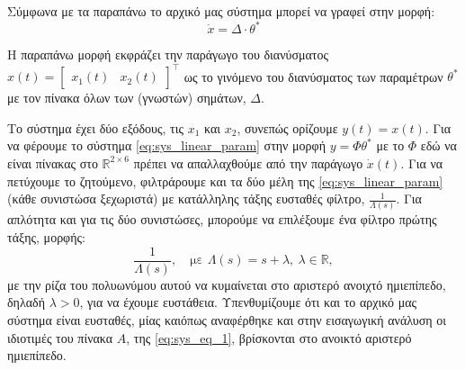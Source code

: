 \documentclass[12pt]{article} %
\numberwithin{equation}{section}  %
\begin{document}
\noindent Σύμφωνα με τα παραπάνω το αρχικό μας σύστημα μπορεί να γραφεί στην μορφή:
\vspace{-\topsep}
\vspace{+2pt}
\begin{equation}\label{eq:sys_linear_param}
    \dot{x} = \Delta \cdot \theta^{*}
\end{equation}

\vspace{-\topsep}
\vspace{+3pt}

\noindent Η παραπάνω μορφή εκφράζει την παράγωγο του διανύσματος $x(t) = \begin{bmatrix} x_1(t) & x_2(t)  \end{bmatrix}^{\top}$ ως το γινόμενο του διανύσματος των παραμέτρων $\theta^{*}$ με τον πίνακα όλων των (γνωστών) σημάτων, $\Delta$.

\vspace{+5pt}

\noindent\textbullet\hspace{0.2em} 
Το σύστημα έχει δύο εξόδους, τις $x_1$ και $x_2$, συνεπώς ορίζουμε $y(t) = x(t)$. 
Για να φέρουμε το σύστημα \eqref{eq:sys_linear_param} στην μορφή $y = \Phi \theta^{*} $\textemdash 
με το $\Phi$ εδώ να είναι πίνακας στο $\mathbb{R}^{2 \times 6}$\textemdash 
πρέπει να απαλλαχθούμε από την παράγωγο $\dot{x}(t)$.
Για να πετύχουμε το ζητούμενο, φιλτράρουμε και τα δύο μέλη της \eqref{eq:sys_linear_param} (κάθε συνιστώσα ξεχωριστά) με κατάλληλης τάξης ευσταθές φίλτρο, $\frac{1}{\Lambda(s)}$.
Για απλότητα και για τις δύο συνιστώσες, μπορούμε να επιλέξουμε ένα φίλτρο πρώτης τάξης, μορφής:
\vspace{-\topsep}
\vspace{+3pt}
\begin{equation}\label{eq:filter}
\frac{1}{\Lambda(s)}, \quad \text{με }\Lambda(s) = s + \lambda,\  \lambda \in \mathbb{R},
\end{equation}
με την ρίζα του πολυωνύμου αυτού να κυμαίνεται στο αριστερό ανοιχτό ημιεπίπεδο, δηλαδή $\lambda > 0$, για να έχουμε ευστάθεια.
Υπενθυμίζουμε ότι και το αρχικό μας σύστημα είναι ευσταθές, μίας και\textemdash όπως αναφέρθηκε και στην εισαγωγική ανάλυση\textemdash 
οι ιδιοτιμές του πίνακα $A$, της \eqref{eq:sys_eq_1}, βρίσκονται στο ανοικτό αριστερό ημιεπίπεδο.


\vspace{+5pt}
\end{document}
